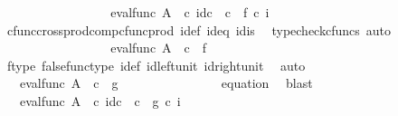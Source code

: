 \begin{isabellebody}
\ \ \ \ \ \ \ \ \ \ \ \ \isamarkupfalse%
\ \isamarkupfalse%
\ {\isachardoublequoteopen}{\isachardot}{\kern0pt}{\isachardot}{\kern0pt}{\isachardot}{\kern0pt}\ {\isacharequal}{\kern0pt}\ eval{\isacharunderscore}{\kern0pt}func\ A\ {\isasymOmega}\ {\isasymcirc}\isactrlsub c\ {\isasymlangle}id\isactrlsub c\ {\isasymOmega}\ {\isasymcirc}\isactrlsub c\ \ {\isasymf}{\isacharcomma}{\kern0pt}f\ {\isasymcirc}\isactrlsub c\ i{\isasymrangle}{\isachardoublequoteclose}\isanewline
\ \ \ \ \ \ \ \ \ \ \ \ \ \ \isamarkupfalse%
\ cfunc{\isacharunderscore}{\kern0pt}cross{\isacharunderscore}{\kern0pt}prod{\isacharunderscore}{\kern0pt}comp{\isacharunderscore}{\kern0pt}cfunc{\isacharunderscore}{\kern0pt}prod\ i{\isacharunderscore}{\kern0pt}def\ id{}{\isacharunderscore}{\kern0pt}eq\ id{}{\isacharunderscore}{\kern0pt}is\ \isamarkupfalse%
\ {\isacharparenleft}{\kern0pt}typecheck{\isacharunderscore}{\kern0pt}cfuncs{\isacharcomma}{\kern0pt}\ auto{\isacharparenright}{\kern0pt}\isanewline
\ \ \ \ \ \ \ \ \ \ \ \ \isamarkupfalse%
\ \isamarkupfalse%
\ {\isachardoublequoteopen}{\isachardot}{\kern0pt}{\isachardot}{\kern0pt}{\isachardot}{\kern0pt}\ {\isacharequal}{\kern0pt}\ eval{\isacharunderscore}{\kern0pt}func\ A\ {\isasymOmega}\ {\isasymcirc}\isactrlsub c\ {\isasymlangle}{\isasymf}{\isacharcomma}{\kern0pt}\ f\ {\isasymrangle}{\isachardoublequoteclose}\isanewline
\ \ \ \ \ \ \ \ \ \ \ \ \ \ \isamarkupfalse%
\ f{\isacharunderscore}{\kern0pt}type\ false{\isacharunderscore}{\kern0pt}func{\isacharunderscore}{\kern0pt}type\ i{\isacharunderscore}{\kern0pt}def\ id{\isacharunderscore}{\kern0pt}left{\isacharunderscore}{\kern0pt}unit{}\ id{\isacharunderscore}{\kern0pt}right{\isacharunderscore}{\kern0pt}unit{}\ \isamarkupfalse%
\ auto\isanewline
\ \ \ \ \ \ \ \ \ \ \ \ \isamarkupfalse%
\ \isamarkupfalse%
\ {\isachardoublequoteopen}{\isachardot}{\kern0pt}{\isachardot}{\kern0pt}{\isachardot}{\kern0pt}\ {\isacharequal}{\kern0pt}\ eval{\isacharunderscore}{\kern0pt}func\ A\ {\isasymOmega}\ {\isasymcirc}\isactrlsub c\ {\isasymlangle}{\isasymf}{\isacharcomma}{\kern0pt}\ g{\isasymrangle}{\isachardoublequoteclose}\isanewline
\ \ \ \ \ \ \ \ \ \ \ \ \ \ \isamarkupfalse%
\ equation{}\ \isamarkupfalse%
\ blast\isanewline
\ \ \ \ \ \ \ \ \ \ \ \ \isamarkupfalse%
\ \isamarkupfalse%
\ {\isachardoublequoteopen}{\isachardot}{\kern0pt}{\isachardot}{\kern0pt}{\isachardot}{\kern0pt}\ {\isacharequal}{\kern0pt}\ eval{\isacharunderscore}{\kern0pt}func\ A\ {\isasymOmega}\ {\isasymcirc}\isactrlsub c\ {\isasymlangle}id\isactrlsub c\ {\isasymOmega}\ {\isasymcirc}\isactrlsub c\ \ {\isasymf}{\isacharcomma}{\kern0pt}g\ {\isasymcirc}\isactrlsub c\ i{\isasymrangle}{\isachardoublequoteclose}\isanewline

\end{isabellebody}
